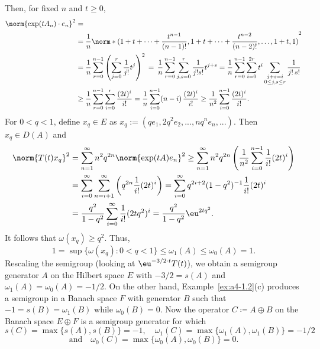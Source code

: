 \begin{example}
Then, for fixed $n$ and $t\ge 0$, 
\begin{align*}
	\norm{\exp(t A_n) \cdot e_n}^2 &= \\
	&= \frac{1}{n} \norm*{ (1 + t + \dots + \frac{t^{n-1}}{(n-1)!}, 1 + t + \dots + \frac{t^{n-2}}{(n-2)!}, \dots, 1+t, 1) }^2 \\
	&=
	\frac{1}{n} \sum_{r=0}^{n-1} \left(\sum_{j=0}^{r} \frac{1}{j!} t^j \right)^2 
	\, = \, \frac{1}{n} \sum_{r=0}^{n-1} \sum_{j,s=0}^{r} \frac{1}{j!s!} t^{j+s} 
	= \frac{1}{n} \sum_{r=0}^{n-1} \sum_{i=0}^{2r} t^i
	\sum_{\substack{j+s=i\\0\le j,s\le r}} \frac{1}{j!\,s!} \\
	&\ge \frac{1}{n} \sum_{r=0}^{n-1} \sum_{i=0}^{r} \frac{(2t)^i}{i!} 
	= \frac{1}{n} \sum_{i=0}^{n-1} (n-i)\,\frac{(2t)^i}{i!} 
	\ge \frac{1}{n^2} \sum_{i=0}^{n-1} \frac{(2t)^i}{i!}.
\end{align*}
For $ 0 < q < 1 $, define $ x_q \in E $ as  
$
x_q :=  (q e_1, 2q^2 e_2, ..., n q^n e_n, ...).
$
Then $x_q \in D(A)$ and
\begin{align*}
	\norm{T(t)x_q}^2 & = \sum_{n=1}^{\infty} n^2 q^{2n} \norm{ \exp(t A) e_n }^2
	\geq \sum_{n=1}^{\infty} n^2 q^{2n} \left(\frac{1}{n^2} \sum_{i=0}^{n-1}  \frac{1}{i!} (2t)^i \right)\\
	&= \sum_{i=0}^{\infty} \sum_{n=i+1}^{\infty} \left( q^{2n} \frac{1}{i!} (2t)^i \right)
	= \sum_{i=0}^{\infty} q^{2i+2} (1 - q^2)^{-1} \frac{1}{i!} (2t)^i \\
	&= \frac{q^2}{1 - q^2} \sum_{i=0}^{\infty} \frac{1}{i!} (2t q^2)^i
	= \frac{q^2}{1 - q^2} \eu^{2t q^2}.
\end{align*}
It follows that $\omega(x_q) \geq q^2$. 
Thus,
\[
1 = \sup \{\omega(x_q)\colon0 < q < 1\} \leq \omega_1(A) \leq \omega_{0}(A) = 1.
\]
Rescaling the semigroup (\ie looking at $\eu^{-3/2 \cdot t} T(t)$), we obtain a semigroup generator $A$ on the Hilbert space $E$ with $-3/2 = s(A)$ and $\omega_1(A) = \omega_{0}(A) = -1/2$. 
On the other hand, Example~\ref{ex:a4-1.2}(c) produces a semigroup in a Banach space $F$ with generator $B$ such that $-1 = s(B) = \omega_1(B)$ while $\omega_{0}(B) = 0$. 
Now the operator $C \coloneq  A \oplus B$ on the Banach space $E \oplus F$ is a semigroup generator for which
\[
s(C) = \max \{s(A), s(B)\} = -1, \quad \omega_1(C) = \max\{\omega_1(A), \omega_1(B)\} = -1/2
\]
\[
\text{and} \quad \omega_{0}(C) = \max\{\omega_{0}(A), \omega_{0}(B)\} = 0.
\]
\end{example}
